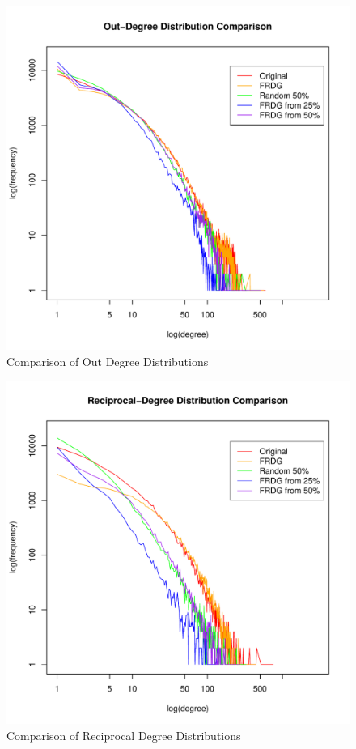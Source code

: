 \documentclass[pdftex,11pt,a4paper,twocolumn]{scrartcl}
\begin{document}
\begin{figure}[h!]
\centering
\includegraphics[width=\columnwidth]{bestsComparison_outDeg.pdf} 
\caption{Comparison of Out Degree Distributions \label{fig:bestOutDeg}}
\end{figure}

\pagebreak

\begin{figure}[h!]
\centering
\includegraphics[width=\columnwidth]{bestsComparison_recipDeg.pdf} 
\caption{Comparison of Reciprocal Degree Distributions \label{fig:bestRecipDeg}}
\end{figure}
\end{document}
